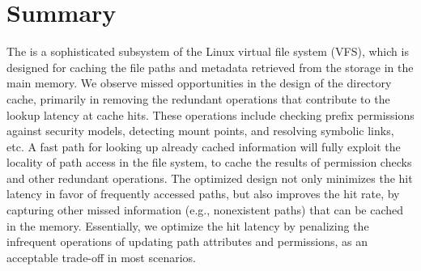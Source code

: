 \newpage
\section{Summary}
\label{sec:dcache:summary}

The  is a sophisticated subsystem
of the Linux virtual file system (VFS),
which is designed for caching the file paths and metadata
retrieved from the storage
in the main memory.
We observe missed opportunities in the design of the directory cache,
primarily in removing the redundant operations
that contribute to the lookup latency at cache hits.
These operations include checking prefix permissions against security models,
detecting mount points,
and resolving symbolic links, etc.
A fast path for looking up already cached information
will fully exploit the locality of path access in the file system,
to cache the results of permission checks and other redundant operations.
The optimized design not only
minimizes the hit latency in favor of frequently accessed paths,
but also improves the hit rate,
by capturing other missed information (e.g., nonexistent paths) that
can be cached in the memory.
Essentially, we optimize the hit latency by penalizing the infrequent operations
of updating path attributes and permissions,
as an acceptable trade-off in most scenarios.






